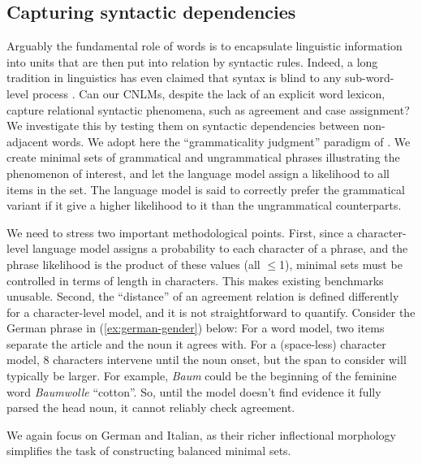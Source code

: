 \subsection{Capturing syntactic dependencies}
\label{sec:dependencies}

Arguably the fundamental role of words is to encapsulate linguistic
information into units that are then put into relation by syntactic
rules. Indeed, a long tradition in linguistics has even claimed that
syntax is blind to any sub-word-level process
\cite[e.g.,][]{Chomsky:1970,DiSciullo:Williams:1987,Bresnan:Mchombo:1995,Williams:2007}. Can
our CNLMs, despite the lack of an explicit word lexicon, capture
relational syntactic phenomena, such as agreement and case assignment?
We investigate this by testing them on syntactic dependencies between
non-adjacent words. We adopt here the ``grammaticality judgment''
paradigm of . We create minimal sets of
grammatical and ungrammatical phrases illustrating the phenomenon of
interest, and let the language model assign a likelihood to all items
in the set. The language model is said to correctly prefer the
grammatical variant if it give a higher likelihood to it than the
ungrammatical counterparts.

We need to stress two important methodological points. First, since a
character-level language model assigns a probability to each character
of a phrase, and the phrase likelihood is the product of these values
(all $\leq$1), minimal sets must be controlled in terms of length in
characters. This makes existing benchmarks unusable. Second, the
``distance'' of an agreement relation is defined differently for a
character-level model, and it is not straightforward to
quantify. Consider the German phrase in (\ref{ex:german-gender})
below: For a word model, two items separate the article and the noun
it agrees with. For a (space-less) character model, 8 characters
intervene until the noun onset, but the span to consider will
typically be larger. For example, \emph{Baum} could be the beginning
of the feminine word \emph{Baumwolle} ``cotton''. So, until the model
doesn't find evidence it fully parsed the head noun, it cannot
reliably check agreement.

We again focus on German and Italian, as their richer inflectional morphology simplifies the task of constructing balanced minimal sets.




